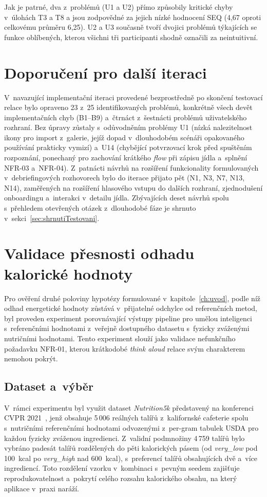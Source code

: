 Jak je patrné, dva z~problémů (U1 a U2) přímo způsobily kritické chyby v~úlohách T3 a T8 a jsou zodpovědné za jejich nízké hodnocení SEQ (4,67 oproti celkovému průměru 6,25).
U2 a U3 současně tvoří dvojici problémů týkajících se funkce oblíbených, kterou všichni tři participanti shodně označili za neintuitivní.

\section{Doporučení pro další iteraci}
\label{sec:doporuceni}

V~navazující implementační iteraci provedené bezprostředně po skončení testovací relace bylo opraveno 23 z~25 identifikovaných problémů, konkrétně všech devět implementačních chyb (B1--B9) a~čtrnáct z~šestnácti problémů uživatelského rozhraní.
Bez úpravy zůstaly s~odůvodněním problémy U1 (nízká nalezitelnost ikony pro import z~galerie, jejíž dopad v~dlouhodobém scénáři opakovaného používání prakticky vymizí) a~U14 (chybějící potvrzovací krok před spuštěním rozpoznání, ponechaný pro zachování krátkého \emph{flow} při zápisu jídla a~splnění NFR-03 a~NFR-04).
Z~patnácti návrhů na rozšíření funkcionality formulovaných v~debriefingových rozhovorech bylo do iterace přijato pět (N1, N3, N7, N13, N14), zaměřených na rozšíření hlasového vstupu do dalších rozhraní, zjednodušení onboardingu a~interakci v~detailu jídla.
Zbývajících deset návrhů spolu s~přehledem otevřených otázek z~dlouhodobé fáze je shrnuto v~sekci~\ref{sec:shrnutiTestovani}.

\section{Validace přesnosti odhadu kalorické hodnoty}
\label{sec:benchmarkPresnost}

Pro ověření druhé poloviny hypotézy formulované v~kapitole~\ref{ch:uvod}, podle níž odhad energetické hodnoty zůstává v~přijatelné odchylce od referenčních metod, byl proveden experiment porovnávající výstupy pipeline pro umělou inteligenci s~referenčními hodnotami z~veřejně dostupného datasetu s~fyzicky zváženými nutričními hodnotami.
Tento experiment slouží jako validace nefunkčního požadavku NFR-01, kterou krátkodobé \emph{think aloud} relace svým charakterem nemohou pokrýt.

\subsection{Dataset a~výběr}
\label{subsec:benchmarkDataset}
V~rámci experimentu byl využit dataset \emph{Nutrition5k} představený na konferenci CVPR 2021~\cite{thames2021nutrition5k}, jenž obsahuje 5\,006 reálných talířů z~kalifornské cafeterie spolu s~nutričními referenčními hodnotami odvozenými z~per-gram tabulek USDA pro každou fyzicky zváženou ingredienci.
Z~validní podmnožiny 4\,759 talířů bylo vybráno padesát talířů rozdělených do pěti kalorických pásem (od \emph{very\_low} pod 100~kcal po \emph{very\_high} nad 600~kcal), s~preferencí talířů obsahujících dvě a~více ingrediencí.
Toto rozdělení vzorku v~kombinaci s~pevným seedem zajišťuje reprodukovatelnost a~pokrytí celého rozsahu kalorického obsahu, na který aplikace v~praxi naráží.

